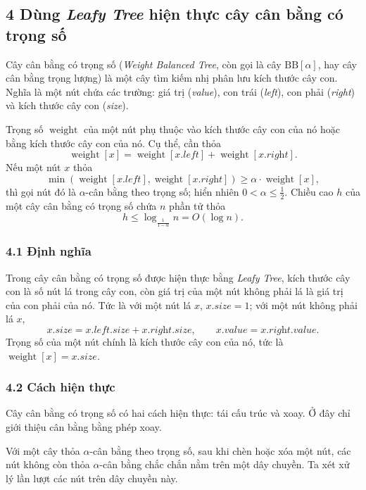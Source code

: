 \documentclass[11pt]{article}
\begin{document}
\subsection*{4 Dùng \emph{Leafy Tree} hiện thực cây cân bằng có trọng số}

Cây cân bằng có trọng số (\emph{Weight Balanced Tree}, còn gọi là cây
\(\mathrm{BB}[\alpha]\), hay cây cân bằng trọng lượng) là một cây tìm kiếm nhị
phân lưu kích thước cây con. Nghĩa là một nút chứa các trường: giá trị
(\textit{value}), con trái (\textit{left}), con phải (\textit{right}) và kích
thước cây con (\textit{size}).

Trọng số \(\operatorname{weight}\) của một nút phụ thuộc vào kích thước cây con
của nó hoặc bằng kích thước cây con của nó. Cụ thể, cần thỏa
\[
  \operatorname{weight}[x]
  =\operatorname{weight}[x.\textit{left}]
  +\operatorname{weight}[x.\textit{right}].
\]
Nếu một nút \(x\) thỏa
\[
  \min(\operatorname{weight}[x.\textit{left}],
       \operatorname{weight}[x.\textit{right}])
  \ge \alpha\cdot\operatorname{weight}[x],
\]
thì gọi nút đó là \(\alpha\)-cân bằng theo trọng số; hiển nhiên
\(0<\alpha\le \frac12\). Chiều cao \(h\) của một cây cân bằng có trọng số chứa
\(n\) phần tử thỏa
\[
  h\le \log_{\frac{1}{1-\alpha}} n=O(\log n).
\]

\subsubsection*{4.1 Định nghĩa}

Trong cây cân bằng có trọng số được hiện thực bằng \emph{Leafy Tree}, kích
thước cây con là số nút lá trong cây con, còn giá trị của một nút không phải lá
là giá trị của con phải của nó. Tức là với một nút lá \(x\),
\(x.\textit{size}=1\); với một nút không phải lá \(x\),
\[
  x.\textit{size}=x.\textit{left}.\textit{size}
  +x.\textit{right}.\textit{size},\qquad
  x.\textit{value}=x.\textit{right}.\textit{value}.
\]
Trọng số của một nút chính là kích thước cây con của nó, tức là
\(\operatorname{weight}[x]=x.\textit{size}\).

\subsubsection*{4.2 Cách hiện thực}

Cây cân bằng có trọng số có hai cách hiện thực: tái cấu trúc và xoay. Ở đây chỉ
giới thiệu cân bằng bằng phép xoay.

Với một cây thỏa \(\alpha\)-cân bằng theo trọng số, sau khi chèn hoặc xóa một
nút, các nút không còn thỏa \(\alpha\)-cân bằng chắc chắn nằm trên một dây
chuyền. Ta xét xử lý lần lượt các nút trên dây chuyền này.
\end{document}
